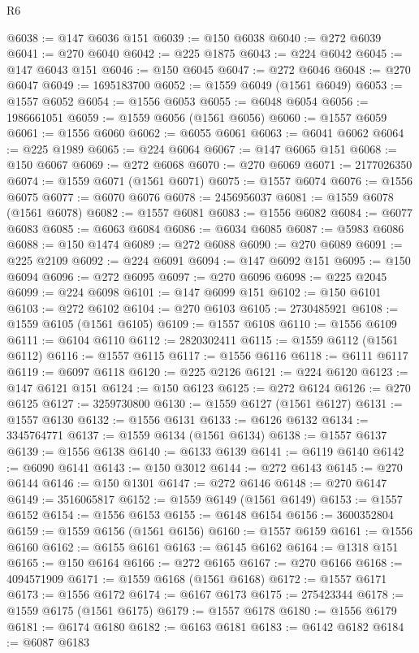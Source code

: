 \begin{lexlean}{R6}
\begin{coremodule}
@6038 := @147 @6036 @151
@6039 := @150 @6038
@6040 := @272 @6039
@6041 := @270 @6040
@6042 := @225 @1875
@6043 := @224 @6042
@6045 := @147 @6043 @151
@6046 := @150 @6045
@6047 := @272 @6046
@6048 := @270 @6047
@6049 := 1695183700
@6052 := @1559 @6049 (@1561 @6049)
@6053 := @1557 @6052
@6054 := @1556 @6053
@6055 := @6048 @6054
@6056 := 1986661051
@6059 := @1559 @6056 (@1561 @6056)
@6060 := @1557 @6059
@6061 := @1556 @6060
@6062 := @6055 @6061
@6063 := @6041 @6062
@6064 := @225 @1989
@6065 := @224 @6064
@6067 := @147 @6065 @151
@6068 := @150 @6067
@6069 := @272 @6068
@6070 := @270 @6069
@6071 := 2177026350
@6074 := @1559 @6071 (@1561 @6071)
@6075 := @1557 @6074
@6076 := @1556 @6075
@6077 := @6070 @6076
@6078 := 2456956037
@6081 := @1559 @6078 (@1561 @6078)
@6082 := @1557 @6081
@6083 := @1556 @6082
@6084 := @6077 @6083
@6085 := @6063 @6084
@6086 := @6034 @6085
@6087 := @5983 @6086
@6088 := @150 @1474
@6089 := @272 @6088
@6090 := @270 @6089
@6091 := @225 @2109
@6092 := @224 @6091
@6094 := @147 @6092 @151
@6095 := @150 @6094
@6096 := @272 @6095
@6097 := @270 @6096
@6098 := @225 @2045
@6099 := @224 @6098
@6101 := @147 @6099 @151
@6102 := @150 @6101
@6103 := @272 @6102
@6104 := @270 @6103
@6105 := 2730485921
@6108 := @1559 @6105 (@1561 @6105)
@6109 := @1557 @6108
@6110 := @1556 @6109
@6111 := @6104 @6110
@6112 := 2820302411
@6115 := @1559 @6112 (@1561 @6112)
@6116 := @1557 @6115
@6117 := @1556 @6116
@6118 := @6111 @6117
@6119 := @6097 @6118
@6120 := @225 @2126
@6121 := @224 @6120
@6123 := @147 @6121 @151
@6124 := @150 @6123
@6125 := @272 @6124
@6126 := @270 @6125
@6127 := 3259730800
@6130 := @1559 @6127 (@1561 @6127)
@6131 := @1557 @6130
@6132 := @1556 @6131
@6133 := @6126 @6132
@6134 := 3345764771
@6137 := @1559 @6134 (@1561 @6134)
@6138 := @1557 @6137
@6139 := @1556 @6138
@6140 := @6133 @6139
@6141 := @6119 @6140
@6142 := @6090 @6141
@6143 := @150 @3012
@6144 := @272 @6143
@6145 := @270 @6144
@6146 := @150 @1301
@6147 := @272 @6146
@6148 := @270 @6147
@6149 := 3516065817
@6152 := @1559 @6149 (@1561 @6149)
@6153 := @1557 @6152
@6154 := @1556 @6153
@6155 := @6148 @6154
@6156 := 3600352804
@6159 := @1559 @6156 (@1561 @6156)
@6160 := @1557 @6159
@6161 := @1556 @6160
@6162 := @6155 @6161
@6163 := @6145 @6162
@6164 := @1318 @151
@6165 := @150 @6164
@6166 := @272 @6165
@6167 := @270 @6166
@6168 := 4094571909
@6171 := @1559 @6168 (@1561 @6168)
@6172 := @1557 @6171
@6173 := @1556 @6172
@6174 := @6167 @6173
@6175 := 275423344
@6178 := @1559 @6175 (@1561 @6175)
@6179 := @1557 @6178
@6180 := @1556 @6179
@6181 := @6174 @6180
@6182 := @6163 @6181
@6183 := @6142 @6182
@6184 := @6087 @6183

\end{coremodule}
\end{lexlean}
